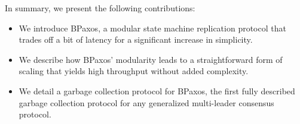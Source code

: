%

In summary, we present the following contributions:
\begin{itemize}
  \item
    We introduce BPaxos, a modular state machine replication protocol that
    trades off a bit of latency for a significant increase in simplicity.
  \item
    We describe how BPaxos' modularity leads to a straightforward form of
    scaling that yields high throughput without added complexity.
  \item
    We detail a garbage collection protocol for BPaxos, the first fully
    described garbage collection protocol for any generalized multi-leader
    consensus protocol.
\end{itemize}
